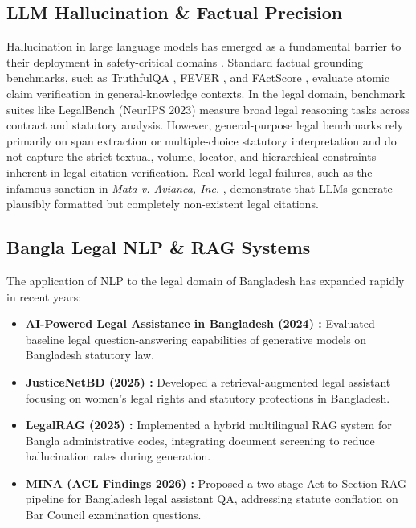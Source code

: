 \documentclass[conference]{IEEEtran}
\begin{document}
\subsection{LLM Hallucination \& Factual Precision}
Hallucination in large language models has emerged as a fundamental barrier to their deployment in safety-critical domains \cite{halueval}. Standard factual grounding benchmarks, such as TruthfulQA \cite{truthfulqa}, FEVER \cite{fever}, and FActScore \cite{factscore}, evaluate atomic claim verification in general-knowledge contexts. In the legal domain, benchmark suites like LegalBench (NeurIPS 2023) \cite{legalbench2023} measure broad legal reasoning tasks across contract and statutory analysis. However, general-purpose legal benchmarks rely primarily on span extraction or multiple-choice statutory interpretation and do not capture the strict textual, volume, locator, and hierarchical constraints inherent in legal citation verification. Real-world legal failures, such as the infamous sanction in \textit{Mata v. Avianca, Inc.} \cite{mata2023}, demonstrate that LLMs generate plausibly formatted but completely non-existent legal citations.

\subsection{Bangla Legal NLP \& RAG Systems}
The application of NLP to the legal domain of Bangladesh has expanded rapidly in recent years:
\begin{itemize}
\item \textbf{AI-Powered Legal Assistance in Bangladesh (2024) \cite{ukildb2024}:} Evaluated baseline legal question-answering capabilities of generative models on Bangladesh statutory law.
\item \textbf{JusticeNetBD (2025) \cite{justicenetbd2025}:} Developed a retrieval-augmented legal assistant focusing on women's legal rights and statutory protections in Bangladesh.
\item \textbf{LegalRAG (2025) \cite{legalrag2025}:} Implemented a hybrid multilingual RAG system for Bangla administrative codes, integrating document screening to reduce hallucination rates during generation.
\item \textbf{MINA (ACL Findings 2026) \cite{mina2026}:} Proposed a two-stage Act-to-Section RAG pipeline for Bangladesh legal assistant QA, addressing statute conflation on Bar Council examination questions.
\end{itemize}
\end{document}
